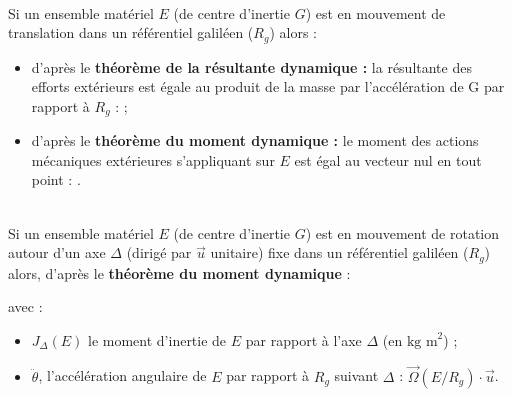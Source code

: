 
\begin{definition} ~\\
Si un ensemble matériel $E$ (de centre d'inertie $G$) est en mouvement de translation dans un référentiel galiléen ($R_g$) alors : 

\begin{itemize}
\item d'après le \textbf{théorème de la résultante dynamique : } la résultante des efforts extérieurs est égale au produit de la masse par l'accélération de G par rapport à $R_g$ :
;%
\item d'après le \textbf{théorème du moment dynamique : } le moment des actions mécaniques extérieures s'appliquant sur $E$ est égal au vecteur nul en tout point :
.
\end{itemize}

\end{definition}
 



\begin{definition} ~\\
Si un ensemble matériel $E$ (de centre d'inertie $G$) est en mouvement de rotation autour d'un axe $\Delta$ (dirigé par $\overrightarrow{u}$ unitaire) fixe dans un référentiel galiléen ($R_g$) alors, d'après le \textbf{théorème du moment dynamique} :

 avec :
\begin{itemize}
\item  $J_{\Delta}(E)$ le moment d'inertie de $E$ par rapport à l'axe $\Delta$ (en $\text{kg  m}^2$) ;
\item $\ddot{\theta}$, l'accélération angulaire de $E$ par rapport à $R_g$ suivant $\Delta$ : $\overrightarrow{\Omega}(E/R_g)\cdot \overrightarrow{u}$.
\end{itemize}
\end{definition}


